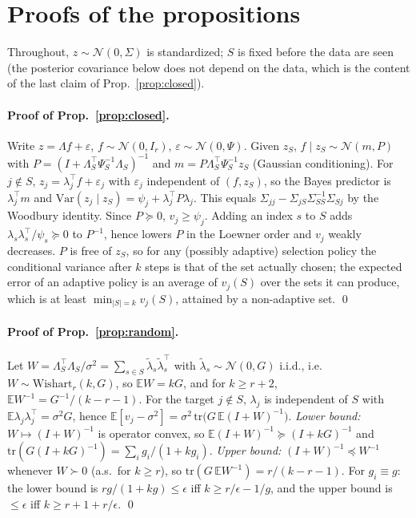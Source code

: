\section{Proofs of the propositions}
\label{app:proofs}

Throughout, $z\sim\mathcal N(0,\Sigma)$ is standardized; $S$ is fixed before the data are seen (the posterior covariance below does not depend on the data, which is the content of the last claim of Prop.~\ref{prop:closed}).

\paragraph{Proof of Prop.~\ref{prop:closed}.}
Write $z=\Lambda f+\varepsilon$, $f\sim\mathcal N(0,I_r)$, $\varepsilon\sim\mathcal N(0,\Psi)$. Given $z_S$, $f\mid z_S\sim\mathcal N(m,P)$ with $P=(I+\Lambda_S^\top\Psi_S^{-1}\Lambda_S)^{-1}$ and $m=P\Lambda_S^\top\Psi_S^{-1}z_S$ (Gaussian conditioning). For $j\notin S$, $z_j=\lambda_j^\top f+\varepsilon_j$ with $\varepsilon_j$ independent of $(f,z_S)$, so the Bayes predictor is $\lambda_j^\top m$ and $\mathrm{Var}(z_j\mid z_S)=\psi_j+\lambda_j^\top P\lambda_j$. This equals $\Sigma_{jj}-\Sigma_{jS}\Sigma_{SS}^{-1}\Sigma_{Sj}$ by the Woodbury identity. Since $P\succeq0$, $v_j\ge\psi_j$. Adding an index $s$ to $S$ adds $\lambda_s\lambda_s^\top/\psi_s\succeq0$ to $P^{-1}$, hence lowers $P$ in the Loewner order and $v_j$ weakly decreases. $P$ is free of $z_S$, so for any (possibly adaptive) selection policy the conditional variance after $k$ steps is that of the set actually chosen; the expected error of an adaptive policy is an average of $v_j(S)$ over the sets it can produce, which is at least $\min_{|S|=k}v_j(S)$, attained by a non-adaptive set. \qed

\paragraph{Proof of Prop.~\ref{prop:random}.}
Let $W=\Lambda_S^\top\Lambda_S/\sigma^2=\sum_{s\in S}\tilde\lambda_s\tilde\lambda_s^\top$ with $\tilde\lambda_s\sim\mathcal N(0,G)$ i.i.d., i.e.\ $W\sim\mathrm{Wishart}_r(k,G)$, so $\mathbb{E}W=kG$, and for $k\ge r+2$, $\mathbb{E}W^{-1}=G^{-1}/(k-r-1)$. For the target $j\notin S$, $\lambda_j$ is independent of $S$ with $\mathbb{E}\lambda_j\lambda_j^\top=\sigma^2G$, hence $\mathbb{E}[v_j-\sigma^2]=\sigma^2\,\mathrm{tr}\big(G\,\mathbb{E}(I+W)^{-1}\big)$.
\emph{Lower bound:} $W\mapsto(I+W)^{-1}$ is operator convex, so $\mathbb{E}(I+W)^{-1}\succeq(I+kG)^{-1}$ and $\mathrm{tr}(G(I+kG)^{-1})=\sum_i g_i/(1+kg_i)$.
\emph{Upper bound:} $(I+W)^{-1}\preceq W^{-1}$ whenever $W\succ0$ (a.s.\ for $k\ge r$), so $\mathrm{tr}(G\,\mathbb{E}W^{-1})=r/(k-r-1)$.
For $g_i\equiv g$: the lower bound is $rg/(1+kg)\le\epsilon$ iff $k\ge r/\epsilon-1/g$, and the upper bound is $\le\epsilon$ iff $k\ge r+1+r/\epsilon$. \qed

